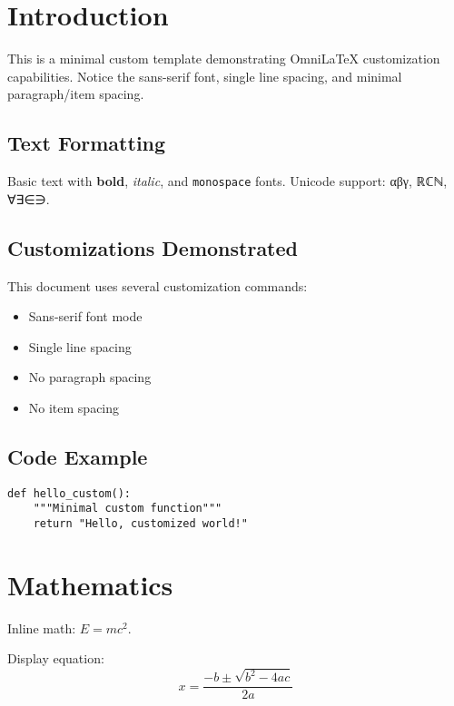 \documentclass[
    language=english,
    institution=none,        %
    oneside,                 %
    loadGlossaries,          %
]{../../omnilatex}
\begin{document}
\maketitle

\tableofcontents

\chapter{Introduction}

This is a minimal custom template demonstrating OmniLaTeX customization capabilities.
Notice the sans-serif font, single line spacing, and minimal paragraph/item spacing.

\section{Text Formatting}

Basic text with \textbf{bold}, \textit{italic}, and \texttt{monospace} fonts.
Unicode support: αβγ, ℝℂℕ, ∀∃∈∋.

\section{Customizations Demonstrated}

This document uses several customization commands:
\begin{itemize}
    \item Sans-serif font mode
    \item Single line spacing
    \item No paragraph spacing
    \item No item spacing
\end{itemize}

\section{Code Example}

\begin{verbatim}
def hello_custom():
    """Minimal custom function"""
    return "Hello, customized world!"
\end{verbatim}

\chapter{Mathematics}

Inline math: $E = mc^2$.

Display equation:
\begin{equation}
    x = \frac{-b \pm \sqrt{b^2 - 4ac}}{2a}
\end{equation}
\end{document}
